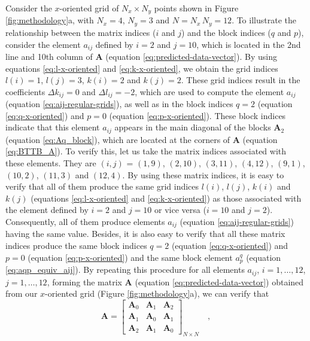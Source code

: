 Consider the $x$-oriented grid of $N_{x} \times N_{y}$ points shown in Figure \ref{fig:methodology}a, 
with $N_{x} = 4$, $N_{y} = 3$ and $N = N_{x} \, N_{y} = 12$.
To illustrate the relationship between the matrix indices ($i$ and $j$) and 
the block indices ($q$ and $p$), consider the element $a_{ij}$ defined by 
$i = 2$ and $j = 10$, which is
located in the 2nd line and 10th column of $\mathbf{A}$ (equation \ref{eq:predicted-data-vector}).
By using equations \ref{eq:l-x-oriented} and \ref{eq:k-x-oriented}, we obtain the 
grid indices $l(i) = 1$, $l(j) = 3$, $k(i) = 2$ and $k(j) = 2$.
These grid indices result in the coefficients $\Delta k_{ij} = 0$ and $\Delta l_{ij} = -2$,
which are used to compute the element $a_{ij}$ (equation \ref{eq:aij-regular-grids}),
as well as in the block indices $q = 2$ (equation \ref{eq:q-x-oriented}) and 
$p = 0$ (equation \ref{eq:p-x-oriented}).
These block indices indicate that this element $a_{ij}$ appears in the main diagonal
of the blocks $\mathbf{A}_{2}$ (equation \ref{eq:Aq_block}), which are located at the corners 
of $\mathbf{A}$ (equation \ref{eq:BTTB_A}).
To verify this, let us take the matrix indices associated with these elements.
They are $(i, j)$ = $(1, 9)$, $(2, 10)$, $(3, 11)$, $(4, 12)$, $(9, 1)$, $(10, 2)$, 
$(11, 3)$ and $(12, 4)$. By using these matrix indices, it is easy to verify that all
of them produce the same grid indices $l(i)$, $l(j)$, $k(i)$ and $k(j)$ 
(equations \ref{eq:l-x-oriented} and \ref{eq:k-x-oriented}) as those associated with
the element defined by $i = 2$ and $j = 10$ or vice versa ($i = 10$ and $j = 2$). 
Consequently, all of them produce
elements $a_{ij}$ (equation \ref{eq:aij-regular-grids}) having the same value.
Besides, it is also easy to verify that all these matrix indices produce the same block
indices $q = 2$ (equation \ref{eq:q-x-oriented}) and $p = 0$ (equation \ref{eq:p-x-oriented})
and the same block element $a^{q}_{p}$ (equation \ref{eq:aqp_equiv_aij}).
By repeating this procedure for all elements $a_{ij}$, $i = 1, \dots, 12$, $j = 1, \dots, 12$, 
forming the matrix $\mathbf{A}$ (equation \ref{eq:predicted-data-vector}) obtained from our 
$x$-oriented grid (Figure \ref{fig:methodology}a), we can verify that
\begin{equation}
\mathbf{A} = \begin{bmatrix}
\mathbf{A}_{0} & \mathbf{A}_{1} & \mathbf{A}_{2} \\
\mathbf{A}_{1} & \mathbf{A}_{0} & \mathbf{A}_{1} \\
\mathbf{A}_{2} & \mathbf{A}_{1} & \mathbf{A}_{0}
\end{bmatrix}_{N \times N} \quad ,
\label{eq:A-x-oriented-example}
\end{equation}
